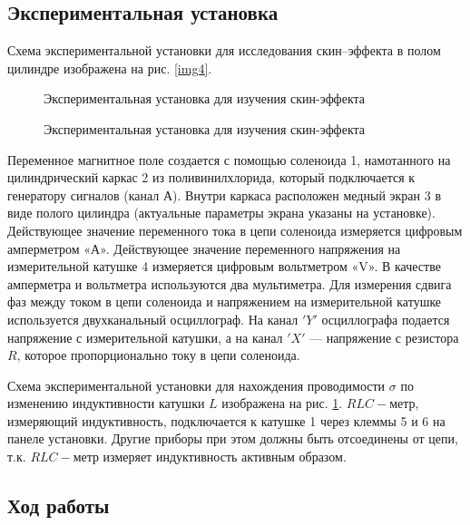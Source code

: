\documentclass[a4paper,12pt]{article} %
\begin{document}
\subsection{Экспериментальная установка}

Схема экспериментальной установки для исследования скин–эффекта в полом цилиндре изображена на рис. \ref{img4}.


\begin{figure}[h]
        \begin{minipage}[h]{1\linewidth}
    	\caption{Экспериментальная установка для изучения скин-эффекта}
            \label{img4}
        \end{minipage}
        \begin{minipage}[h]{1\linewidth}
    	\caption{Экспериментальная установка для изучения скин-эффекта}
            \label{img5}
        \end{minipage}
    \end{figure}
	

Переменное магнитное поле создается с помощью соленоида 1, намотанного на цилиндрический каркас 2 из поливинилхлорида, который подключается к генератору сигналов (канал А). Внутри каркаса расположен медный экран 3 в виде полого цилиндра (актуальные параметры экрана указаны на установке). Действующее значение переменного тока в цепи соленоида измеряется цифровым амперметром «А». Действующее значение переменного напряжения на измерительной катушке 4 измеряется цифровым вольтметром «V». В качестве амперметра и вольтметра используются два мультиметра.
Для измерения сдвига фаз между током в цепи соленоида и напряжением на измерительной катушке используется двухканальный осциллограф. На канал $'Y'$ осциллографа подается напряжение с измерительной катушки, а на канал $'X'$ — напряжение с резистора $R$, которое пропорционально току в цепи соленоида.

Схема экспериментальной установки для нахождения проводимости $\sigma$ по изменению индуктивности катушки $L$ изображена на рис. \ref{img5}. $RLC-метр$, измеряющий индуктивность, подключается к катушке 1 через клеммы 5 и 6 на панеле установки. Другие приборы при этом должны быть отсоединены от цепи, т.к. $RLC-метр$ измеряет индуктивность активным образом.

\subsection{Ход работы}
\end{document}
